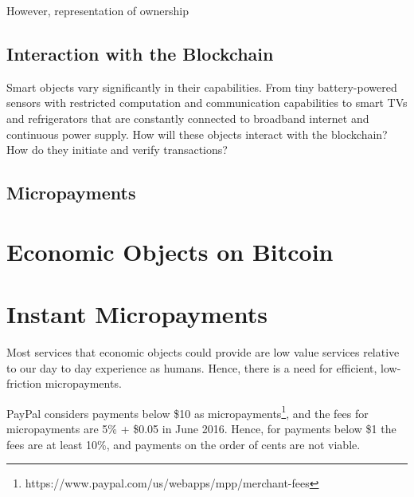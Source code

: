 However, representation of ownership 

\subsection{Interaction with the Blockchain}

Smart objects vary significantly in their capabilities. From tiny battery-powered sensors with restricted computation and communication capabilities to smart TVs and refrigerators that are constantly connected to broadband internet and continuous power supply. How will these objects interact with the blockchain? How do they initiate and verify transactions? 

\subsection{Micropayments}

\section{Economic Objects on Bitcoin}

\section{Instant Micropayments}

Most services that economic objects could provide are low value services relative to our day to day experience as humans. Hence, there is a need for efficient, low-friction micropayments. 

PayPal considers payments below \$10 as micropayments\footnote{https://www.paypal.com/us/webapps/mpp/merchant-fees}, and the fees for micropayments are 5\% + \$0.05 in June 2016. Hence, for payments below \$1 the fees are at least 10\%, and payments on the order of cents are not viable. 

